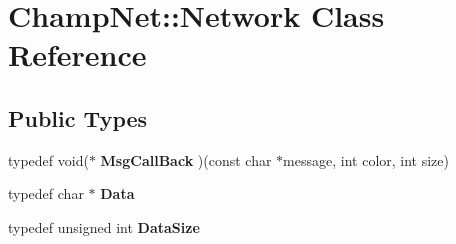 \hypertarget{class_champ_net_1_1_network}{\section{Champ\-Net\-:\-:Network Class Reference}
\label{class_champ_net_1_1_network}
}
\subsection*{Public Types}
\begin{DoxyCompactItemize}
\item 
\hypertarget{class_champ_net_1_1_network_a3f98f6ee0fd5617faa5679162195b39a}{typedef void($\ast$ {\bfseries Msg\-Call\-Back} )(const char $\ast$message, int color, int size)}\label{class_champ_net_1_1_network_a3f98f6ee0fd5617faa5679162195b39a}

\item 
\hypertarget{class_champ_net_1_1_network_af03ef34820a69b9ef3f2dc3065a29c3f}{typedef char $\ast$ {\bfseries Data}}\label{class_champ_net_1_1_network_af03ef34820a69b9ef3f2dc3065a29c3f}

\item 
\hypertarget{class_champ_net_1_1_network_a5f153a3f9a1687d10922c946e2f0662e}{typedef unsigned int {\bfseries Data\-Size}}\label{class_champ_net_1_1_network_a5f153a3f9a1687d10922c946e2f0662e}

\end{DoxyCompactItemize}
